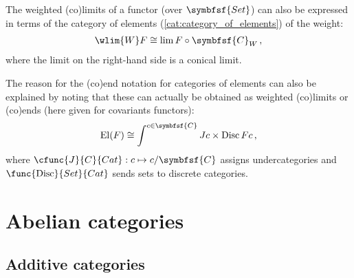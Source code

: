     \begin{property}
        The weighted (co)limits of a functor (over $\symbfsf{Set}$) can also be expressed in terms of the category of elements (\cref{cat:category_of_elements}) of the weight:
        \begin{gather}
            \wlim{W}F\cong\lim F\circ\symbfsf{C}_W\,,
        \end{gather}
        where the limit on the right-hand side is a conical limit.

        The reason for the (co)end notation for categories of elements can also be explained by noting that these can actually be obtained as weighted (co)limits or (co)ends (here given for covariants functors):
        \begin{gather}
            \mathrm{El}(F) \cong \int^{c\in\symbfsf{C}}Jc\times\mathrm{Disc}\,Fc\,,
        \end{gather}
        where $\cfunc{J}{C}{Cat}:c\mapsto c/\symbfsf{C}$ assigns undercategories and $\func{\mathrm{Disc}}{Set}{Cat}$ sends sets to discrete categories.
    \end{property}

\section{Abelian categories}\label{section:abelian_categories}
\subsection{Additive categories}


